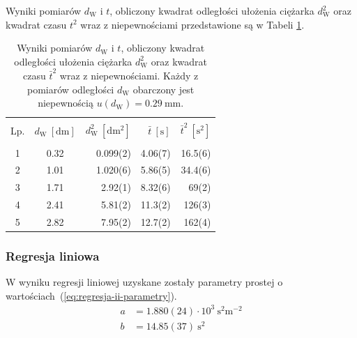 \documentclass[twocolumn, a4paper, polish, 10pt]{article}
\newcommand{\dwSq}{\ensuremath{ d_{\mathrm{W}}^2 }}
\begin{document}
Wyniki pomiarów $d_{\mathrm{W}}$ i $t$, obliczony kwadrat odległości ułożenia ciężarka $\dwSq$ oraz kwadrat czasu $t^2$ wraz z niepewnościami przedstawione są w Tabeli \ref{tab:zaleznosc-ii}.
\begin{table}[ht]
\begin{center}
\renewcommand*{\tablename}{Tabela}
\caption{\small Wyniki pomiarów $d_{\mathrm{W}}$ i $t$, obliczony kwadrat odległości ułożenia ciężarka $\dwSq$ oraz kwadrat czasu $\bar{t}^2$ wraz z niepewnościami.
Każdy z pomiarów odległości $d_{\mathrm{W}}$ obarczony jest niepewnością $u(d_{\mathrm{W}}) = 0.29~\mathrm{mm}$.\vspace{0.15cm}
    \label{tab:zaleznosc-ii}}
    {\small
    \begin{tabular}{c c r r r}
    \hline \vspace{-0.35cm} \\
      Lp.
      & $d_{\mathrm{W}}~[\mathrm{dm}]$ & $\dwSq~[\mathrm{dm^2}]$
      & $\bar{t}~[\mathrm{s}]$ & $\bar{t}^2~[\mathrm{s^2}]$ \\ 
      \hline \vspace{-0.2cm} \\
      1 & 0.32 & 0.099(2) & 4.06(7) & 16.5(6) \\
      2 & 1.01 & 1.020(6) & 5.86(5) & 34.4(6) \\
      3 & 1.71 & 2.92(1) & 8.32(6) & 69(2) \\
      4 & 2.41 & 5.81(2) & 11.3(2) & 126(3) \\
      5 & 2.82 & 7.95(2) & 12.7(2) & 162(4) \\
   
    \hline
    \end{tabular}}
    \end{center}
\end{table}

\subsubsection{Regresja liniowa}
W wyniku regresji liniowej uzyskane zostały parametry prostej o wartościach~(\ref{eq:regresja-ii-parametry}).
\begin{equation}
\begin{split}
    a &= 1.880(24) \cdot 10^3~\mathrm{ s^2 m^{-2} } \\
    b &= 14.85(37)~\mathrm{s^2}
    \label{eq:regresja-ii-parametry}
\end{split}
\end{equation}
\end{document}
